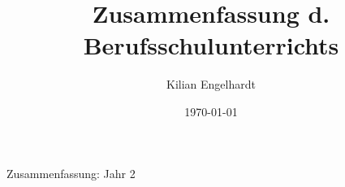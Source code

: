 \documentclass[11pt,a4paper,oneside,ngerman]{article}
\author{Kilian Engelhardt}
\title{Zusammenfassung d. Berufsschulunterrichts}
\date{\today}
\begin{document}
	\begin{center}
		\Huge{Zusammenfassung: Jahr 2}
	\end{center}

%
\tableofcontents
\newpage
\pagestyle{fancy}
\setcounter{page}{1}


\end{document}
